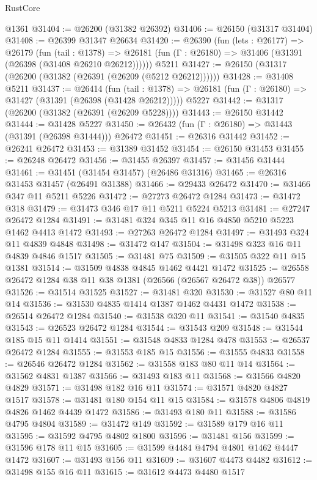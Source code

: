 \begin{lexlean}{RustCore}
\begin{coremodule}
    @1361
@31404 := @26200 (@31382 @26392)
@31406 := @26150 (@31317 @31404)
@31408 := @26399 @31347 @26634
@31420 := @26390
    (fun (lets : @26177) =>
    @26179
      (fun (tail : @1378) =>
      @26181 (fun (Γ : @26180) => @31406 (@31391 (@26398 (@31408 @26210 @26212))))))
    @5211
@31427 := @26150 (@31317 (@26200 (@31382 (@26391 (@26209 (@5212 @26212))))))
@31428 := @31408 @5211
@31437 := @26414
    (fun (tail : @1378) => @26181 (fun (Γ : @26180) => @31427 (@31391 (@26398 (@31428 @26212)))))
    @5227
@31442 := @31317 (@26200 (@31382 (@26391 (@26209 @5228))))
@31443 := @26150 @31442
@31444 := @31428 @5227
@31450 := @26432 (fun (Γ : @26180) => @31443 (@31391 (@26398 @31444))) @26472
@31451 := @26316 @31442
@31452 := @26241 @26472
@31453 := @31389 @31452
@31454 := @26150 @31453
@31455 := @26248 @26472
@31456 := @31455 @26397
@31457 := @31456 @31444
@31461 := @31451 (@31454 @31457) (@26486 @31316)
@31465 := @26316 @31453 @31457 (@26491 @31388)
@31466 := @29433 @26472
@31470 := @31466 @347 @11 @5211 @5226
@31472 := @27273 @26472 @1284
@31473 := @31472 @318
@31479 := @31473 @346 @17 @11 @5211 @5224 @5213
@31481 := @27247 @26472 @1284
@31491 := @31481 @324 @345 @11 @16 @4850 @5210 @5223 @1462 @4413 @1472
@31493 := @27263 @26472 @1284
@31497 := @31493 @324 @11 @4839 @4848
@31498 := @31472 @147
@31504 := @31498 @323 @16 @11 @4839 @4846 @1517
@31505 := @31481 @75
@31509 := @31505 @322 @11 @15 @1381
@31514 := @31509 @4838 @4845 @1462 @4421 @1472
@31525 := @26558 @26472 @1284 @38 @11 @38 @1381 (@26566 (@26567 @26472 @38)) @26577
@31526 := @31514 @31525
@31527 := @31481 @320
@31530 := @31527 @80 @11 @14
@31536 := @31530 @4835 @1414 @1387 @1462 @4431 @1472
@31538 := @26514 @26472 @1284
@31540 := @31538 @320 @11
@31541 := @31540 @4835
@31543 := @26523 @26472 @1284
@31544 := @31543 @209
@31548 := @31544 @185 @15 @11 @1414
@31551 := @31548 @4833 @1284 @478
@31553 := @26537 @26472 @1284
@31555 := @31553 @185 @15
@31556 := @31555 @4833
@31558 := @26546 @26472 @1284
@31562 := @31558 @183 @80 @11 @14
@31564 := @31562 @4831 @1387
@31566 := @31493 @183 @11
@31568 := @31566 @4820 @4829
@31571 := @31498 @182 @16 @11
@31574 := @31571 @4820 @4827 @1517
@31578 := @31481 @180 @154 @11 @15
@31584 := @31578 @4806 @4819 @4826 @1462 @4439 @1472
@31586 := @31493 @180 @11
@31588 := @31586 @4795 @4804
@31589 := @31472 @149
@31592 := @31589 @179 @16 @11
@31595 := @31592 @4795 @4802 @1800
@31596 := @31481 @156
@31599 := @31596 @178 @11 @15
@31605 := @31599 @4484 @4794 @4801 @1462 @4447 @1472
@31607 := @31493 @156 @11
@31609 := @31607 @4473 @4482
@31612 := @31498 @155 @16 @11
@31615 := @31612 @4473 @4480 @1517

\end{coremodule}
\end{lexlean}
